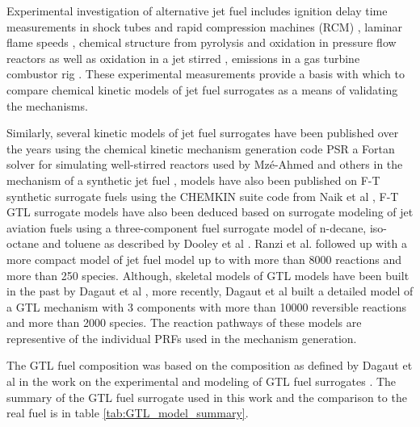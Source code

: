 Experimental investigation of alternative jet fuel includes ignition delay time measurements in shock tubes and rapid compression machines (RCM) \cite{Dean2007AutoignitionPressures}\cite{Wang2012}\cite{Malewicki2013ExperimentalN-dodecane}\cite{Dagaut2014}\cite{Dagaut2014CombustionModeling}\cite{Dagaut2016ExperimentalSurrogates}\cite{Askari2016}\cite{Valco2016LowMachine}, laminar flame speeds \cite{Singh2011ExperimentalFlames}\cite{Wang2012}\cite{Hui2013LaminarPressures}\cite{Dagaut2014}\cite{Yu2016TheoreticalFuel}, chemical structure from pyrolysis and oxidation in pressure flow reactors as well as oxidation in a jet stirred \cite{Gokulakrishnan2007ExperimentalConditions}\cite{Gokulakrishnan2008IgnitionFuel}\cite{Honnet2009AKerosene}\cite{Dooley2010AProperties}\cite{Mze-Ahmed2010KineticsStudy}\cite{Dagaut2014CombustionModeling}\cite{Dagaut2014}\cite{Dagaut2015TheStudy}\cite{Dagaut2016ExperimentalSurrogates}, emissions in a gas turbine combustor rig \cite{Hermann2006ChemicalFuel}. These experimental measurements provide a basis with which to compare chemical kinetic models of jet fuel surrogates as a means of validating the mechanisms. 

Similarly, several kinetic models of jet fuel surrogates have been published over the years using the chemical kinetic mechanism generation code PSR \cite{Glarborg1986PSR:Reactors} a Fortan solver for simulating well-stirred reactors used by Mzé-Ahmed and others in the mechanism of a synthetic jet fuel \cite{Mze-Ahmed2010KineticsStudy}, models have also been published on F-T synthetic surrogate fuels using the CHEMKIN suite code from Naik et al \cite{Naik2011DetailedFuels}, F-T GTL surrogate models have also been deduced based on surrogate modeling of jet aviation fuels using a three-component fuel surrogate model of n-decane, iso-octane and toluene as described by Dooley et al \cite{Dooley2010MethylModel}. Ranzi et al. followed up with a more compact model of jet fuel model up to  \cite{Ranzi2012HierarchicalFuels} with more than 8000 reactions and more than 250 species. Although, skeletal models of GTL models have been built in the past by Dagaut et al \cite{Dagaut2014}, more recently, Dagaut et al \cite{Dagaut2016ExperimentalSurrogates} built a detailed model of a GTL mechanism with 3 components with more than 10000 reversible reactions and more than 2000 species. The reaction pathways of these models are representive of the individual PRFs used in the mechanism generation.


The GTL fuel composition was based on the composition as defined by Dagaut et al in the work on the experimental and modeling of GTL fuel surrogates \cite{Dagaut2014}. The summary of the GTL fuel surrogate used in this work and the comparison to the real fuel is in table \ref{tab:GTL_model_summary}.


